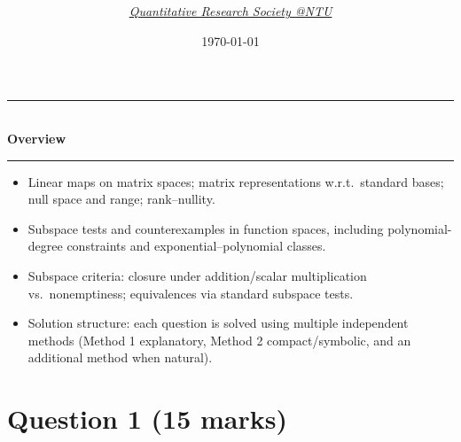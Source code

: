 \documentclass[12pt]{article}
\title{
\Huge \CourseCode\ \CourseName \\[0.3em]
\Large \DocType  \\[0.3em]
\large \ExamMeta
}
\author{
  \textit{\href{https://qrsntu.org}{Quantitative Research Society @NTU}}
}
\date{\today}
\newenvironment{overview}{
  \par\bigskip
  \begin{center}
    \rule{0.92\linewidth}{0.6pt}\\[-0.2em]
    \textbf{Overview}\\[-0.2em]
    \rule{0.92\linewidth}{0.6pt}
  \end{center}
  \vspace{-0.3em}
  \begin{itemize}[leftmargin=1.6em, itemsep=0.2em, topsep=0.2em]
}{
  \end{itemize}
  \par\bigskip
}
\begin{document}
\maketitle
\thispagestyle{plainfirst}
\pagestyle{main}

\begin{overview}
  \item Linear maps on matrix spaces; matrix representations w.r.t.\ standard bases; null space and range; rank--nullity.
  \item Subspace tests and counterexamples in function spaces, including polynomial-degree constraints and exponential--polynomial classes.
  \item Subspace criteria: closure under addition/scalar multiplication vs.\ nonemptiness; equivalences via standard subspace tests.
  \item Solution structure: each question is solved using multiple independent methods (Method 1 explanatory, Method 2 compact/symbolic, and an additional method when natural).
\end{overview}

\newpage
\tableofcontents
\newpage
\section{Question 1 \hfill (15 marks)}
\end{document}
